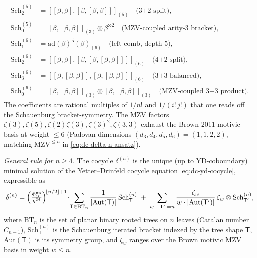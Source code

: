 \begin{theorem}
\begin{align*}
\mathrm{Sch}^{(5)}_2
 &= [[\beta,\beta],[\beta,[\beta,\beta]]]_{(5)} \quad\text{(3+2 split),}\\
\mathrm{Sch}^{(5)}_0
 &= [\beta,[\beta,\beta]]_{(3)}\otimes\beta^{\otimes 2} \quad\text{(MZV-coupled arity-3 bracket)},\\
\mathrm{Sch}^{(6)}_1
 &= \mathrm{ad}(\beta)^{5}(\beta)_{(6)} \quad\text{(left-comb, depth }5\text{),}\\
\mathrm{Sch}^{(6)}_2
 &= [[\beta,\beta],[\beta,[\beta,[\beta,\beta]]]]_{(6)} \quad\text{(4+2 split),}\\
\mathrm{Sch}^{(6)}_3
 &= [[\beta,[\beta,\beta]],[\beta,[\beta,\beta]]]_{(6)} \quad\text{(3+3 balanced),}\\
\mathrm{Sch}^{(6)}_0
 &= [\beta,[\beta,\beta]]_{(3)}\otimes[\beta,[\beta,\beta]]_{(3)}
 \quad\text{(MZV-coupled 3+3 product).}
\end{align*}
The coefficients are rational multiples of $1/n!$ and $1/(i!\,j!)$ that one
reads off the Schauenburg bracket-symmetry. The MZV factors
$\zeta(3), \zeta(5), \zeta(2)\zeta(3), \zeta(3)^2, \zeta(3,3)$ exhaust the
Brown 2011 motivic basis at weight $\leq 6$ (Padovan dimensions
$(d_3, d_4, d_5, d_6) = (1, 1, 2, 2)$, matching $\mathrm{MZV}^{\leq n}$ in
\eqref{eq:dc-delta-n-ansatz}).

\emph{General rule for $n \geq 4$.} The cocycle $\delta^{(n)}$ is the
unique (up to YD-coboundary) minimal solution of the Yetter--Drinfeld
cocycle equation \eqref{eq:dc-yd-cocycle}, expressible as
\begin{equation}
\label{eq:dc-delta-n-general-rule}
\delta^{(n)}
= \Bigl(\tfrac{\Phi_{10}^{\mathrm{un}}}{\eta^{24}}\Bigr)^{\!\lfloor n/2\rfloor + 1}
 \!\cdot\!
 \sum_{\mathsf{T}\in\mathrm{BT}_{n}}
 \frac{1}{|\mathrm{Aut}(\mathsf{T})|}\,
 \mathrm{Sch}^{(n)}_{\mathsf{T}}
 \;+\;
 \sum_{w+|\mathsf{T}'|=n}
 \frac{\zeta_{w}}{w\cdot|\mathrm{Aut}(\mathsf{T}')|}\,
 \zeta_w\otimes\mathrm{Sch}^{(n)}_{\mathsf{T}'},
\end{equation}
where $\mathrm{BT}_n$ is the set of planar binary rooted trees on $n$ leaves
(Catalan number $C_{n-1}$), $\mathrm{Sch}^{(n)}_{\mathsf{T}}$ is the
Schauenburg iterated bracket indexed by the tree shape $\mathsf{T}$,
$\mathrm{Aut}(\mathsf{T})$ is its symmetry group, and $\zeta_w$ ranges over
the Brown motivic MZV basis in weight $w\leq n$.
\end{theorem}

